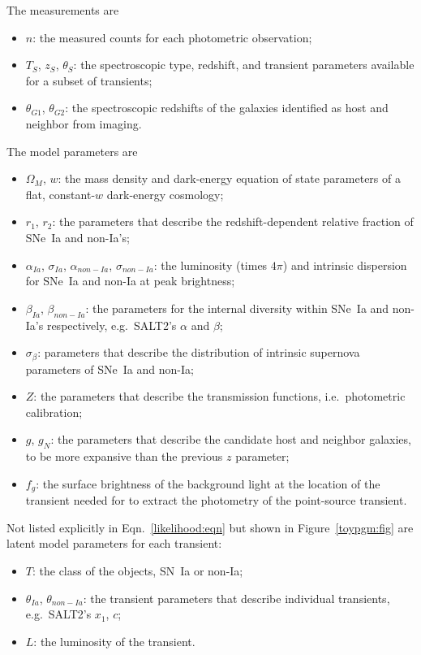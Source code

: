\documentclass[preprint,3p]{elsarticle}
\begin{document}
The measurements are
\begin{itemize}
\item $n$: the measured counts for each photometric observation;
\item ${{T}}_S$, ${{z}}_S$, $\theta_S$: the spectroscopic type, redshift, and transient parameters available for a subset of transients;
\item $\theta_{G1}$, $\theta_{G2}$: the spectroscopic redshifts of the galaxies identified
as host and neighbor from imaging.
\end{itemize}
The model parameters are
\begin{itemize}
\item $\Omega_M$, $w$: the mass density and dark-energy equation of state parameters of a flat,
constant-$w$ dark-energy cosmology;
\item $r_1$, $r_2$:  the parameters
that describe the redshift-dependent relative fraction of SNe~Ia and non-Ia's;
\item $\alpha_{Ia}$, $\sigma_{Ia}$, $\alpha_{\mathit{non-Ia}}$, $\sigma_{\mathit{non-Ia}}$:
the luminosity (times $4\pi$) and intrinsic dispersion for SNe~Ia and non-Ia at peak brightness;
\item $\beta_{Ia}$, $\beta_{non-Ia}$: the parameters for the internal diversity within SNe~Ia and
non-Ia's respectively, e.g.\ SALT2's  $\alpha$ and $\beta$;
\item $\sigma_\beta$: parameters that describe the distribution of intrinsic supernova
parameters of SNe~Ia and non-Ia;
\item $Z$: the parameters that describe the transmission functions, i.e.\ photometric calibration;
\item $g$, $g_N$: the parameters that describe the candidate host and neighbor galaxies,
to be more expansive than the previous $z$ parameter;
\item $f_g$: the surface brightness of the background light at the location of the transient
needed for to extract the photometry of the point-source transient.
\end{itemize}
Not listed explicitly in Eqn.~\ref{likelihood:eqn} but shown in Figure~\ref{toypgm:fig} are latent model parameters for each transient:
\begin{itemize}
\item $T$: the class of the objects, SN~Ia or non-Ia;
\item $\theta_{Ia}$, $\theta_{non-Ia}$: the transient parameters that describe individual
transients, e.g.\ SALT2's $x_1$, $c$;
\item $L$: the luminosity of the transient.
\end{itemize}
\end{document}
